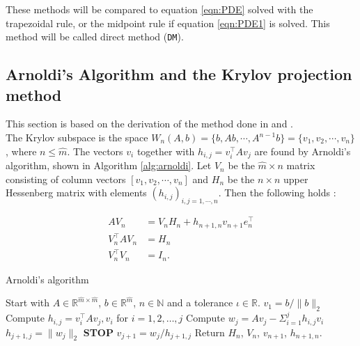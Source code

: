 \noindent These methods will be compared to equation \eqref{eqn:PDE} solved with the trapezoidal rule, or the midpoint rule if equation \eqref{eqn:PDE1} is solved. This method will be called direct method (\texttt{DM}). 



\subsection{Arnoldi's Algorithm and the Krylov projection method} %
\label{sec:KPM}
This section is based on the derivation of the method done in \cite{elena} and \cite{min}. \\

\noindent The Krylov subspace is the space $W_n (A,b) = \{b,Ab, \cdots, A^{n-1}b\} = \{v_1,v_2,\cdots,v_n\} $, where $n \leq \hat{m}$.
The vectors $v_i$ together with $h_{i,j} = v_i^\top Av_j$ are found by Arnoldi's algorithm, shown in Algorithm \ref{alg:arnoldi}. Let $V_n$ be the $\hat{m} \times n$ matrix consisting of column vectors $[v_1,v_2,\cdots,v_n ] $ and $H_n$ be the $n \times n$ upper Hessenberg matrix with elements $(h_{i,j})_{i,j=1,\cdots,n}$. Then the following holds \cite{kryprop}:

\begin{equation}
\begin{aligned}
AV_n & = V_n H_n + h_{n+1,n}v_{n+1}e^\top_n  \\
V^{\top}_n AV_n &= H_n  \\
V_n^{\top} V_n &= I_n. 
\label{eqn:propA}
\end{aligned}
\end{equation}

\begin{algorithm} [h!]
\begin{algorithmic} \caption{Arnoldi's algorithm\cite{arnold}} \label{alg:arnoldi}  
\STATE Start with $A \in \mathbb{R}^{\hat{m} \times \hat{m}}$, $b \in \mathbb{R}^{\hat{m}}$, $n \in \mathbb{N}$ and a tolerance $\iota \in \mathbb{R}$.
\STATE $v_1 = b/\|b \|_2$
   \STATE Compute $h_{i,j} =  v_i^{\top}Av_j,v_i $ for $i = 1,2,\dots, j$
    \STATE Compute $w_j = A v_j - \Sigma_{i=1}^{j} h_{i,j}v_i $
    \STATE $h_{j+1,j} = \| w_j \|_2$
        \STATE\textbf{STOP}
    \ENDIF 
   \STATE $v_{j+1} = w_j/h_{j+1,j}$
\ENDFOR
\STATE Return $H_n$, $V_n$, $v_{n+1}$, $h_{n+1,n}$.
\end{algorithmic} 
\end{algorithm}



